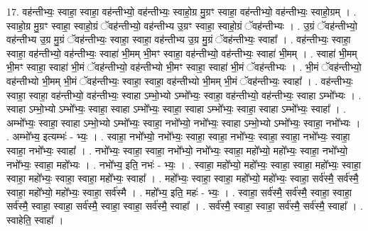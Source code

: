 \documentclass[17pt]{extarticle}
\begin{document}
17. वह॑न्तीभ्यः॒ स्वाहा॒ स्वाहा॒ वह॑न्तीभ्यो॒ वह॑न्तीभ्यः॒ स्वाहो॒ग्र मु॒ग्रꣳ स्वाहा॒ वह॑न्तीभ्यो॒ वह॑न्तीभ्यः॒ स्वाहो॒ग्रम् । . स्वाहो॒ग्र मु॒ग्रꣳ स्वाहा॒ स्वाहो॒ग्रं ॅवह॑न्तीभ्यो॒ वह॑न्तीभ्य उ॒ग्रꣳ स्वाहा॒ स्वाहो॒ग्रं ॅवह॑न्तीभ्यः । . उ॒ग्रं ॅवह॑न्तीभ्यो॒ वह॑न्तीभ्य उ॒ग्र मु॒ग्रं ॅवह॑न्तीभ्यः॒ स्वाहा॒ स्वाहा॒ वह॑न्तीभ्य उ॒ग्र मु॒ग्रं ॅवह॑न्तीभ्यः॒ स्वाहा᳚ । . वह॑न्तीभ्यः॒ स्वाहा॒ स्वाहा॒ वह॑न्तीभ्यो॒ वह॑न्तीभ्यः॒ स्वाहा॑ भी॒मम् भी॒मꣳ स्वाहा॒ वह॑न्तीभ्यो॒ वह॑न्तीभ्यः॒ स्वाहा॑ भी॒मम् । . स्वाहा॑ भी॒मम् भी॒मꣳ स्वाहा॒ स्वाहा॑ भी॒मं ॅवह॑न्तीभ्यो॒ वह॑न्तीभ्यो भी॒मꣳ स्वाहा॒ स्वाहा॑ भी॒मं ॅवह॑न्तीभ्यः । . भी॒मं ॅवह॑न्तीभ्यो॒ वह॑न्तीभ्यो भी॒मम् भी॒मं ॅवह॑न्तीभ्यः॒ स्वाहा॒ स्वाहा॒ वह॑न्तीभ्यो भी॒मम् भी॒मं ॅवह॑न्तीभ्यः॒ स्वाहा᳚ । . वह॑न्तीभ्यः॒ स्वाहा॒ स्वाहा॒ वह॑न्तीभ्यो॒ वह॑न्तीभ्यः॒ स्वाहा ऽम्भो॒भ्यो ऽम्भो᳚भ्यः॒ स्वाहा॒ वह॑न्तीभ्यो॒ वह॑न्तीभ्यः॒ स्वाहा ऽम्भो᳚भ्यः । . स्वाहा ऽम्भो॒भ्यो ऽम्भो᳚भ्यः॒ स्वाहा॒ स्वाहा ऽम्भो᳚भ्यः॒ स्वाहा॒ स्वाहा ऽम्भो᳚भ्यः॒ स्वाहा॒ स्वाहा ऽम्भो᳚भ्यः॒ स्वाहा᳚ । . अम्भो᳚भ्यः॒ स्वाहा॒ स्वाहा ऽम्भो॒भ्यो ऽम्भो᳚भ्यः॒ स्वाहा॒ नभो᳚भ्यो॒ नभो᳚भ्यः॒ स्वाहा ऽम्भो॒भ्यो ऽम्भो᳚भ्यः॒ स्वाहा॒ नभो᳚भ्यः । . अम्भो᳚भ्य॒ इत्यम्भः॑ - भ्यः॒ । . स्वाहा॒ नभो᳚भ्यो॒ नभो᳚भ्यः॒ स्वाहा॒ स्वाहा॒ नभो᳚भ्यः॒ स्वाहा॒ स्वाहा॒ नभो᳚भ्यः॒ स्वाहा॒ स्वाहा॒ नभो᳚भ्यः॒ स्वाहा᳚ । . नभो᳚भ्यः॒ स्वाहा॒ स्वाहा॒ नभो᳚भ्यो॒ नभो᳚भ्यः॒ स्वाहा॒ महो᳚भ्यो॒ महो᳚भ्यः॒ स्वाहा॒ नभो᳚भ्यो॒ नभो᳚भ्यः॒ स्वाहा॒ महो᳚भ्यः । . नभो᳚भ्य॒ इति॒ नभः॑ - भ्यः॒ । . स्वाहा॒ महो᳚भ्यो॒ महो᳚भ्यः॒ स्वाहा॒ स्वाहा॒ महो᳚भ्यः॒ स्वाहा॒ स्वाहा॒ महो᳚भ्यः॒ स्वाहा॒ स्वाहा॒ महो᳚भ्यः॒ स्वाहा᳚ । . महो᳚भ्यः॒ स्वाहा॒ स्वाहा॒ महो᳚भ्यो॒ महो᳚भ्यः॒ स्वाहा॒ सर्व॑स्मै॒ सर्व॑स्मै॒ स्वाहा॒ महो᳚भ्यो॒ महो᳚भ्यः॒ स्वाहा॒ सर्व॑स्मै । . महो᳚भ्य॒ इति॒ महः॑ - भ्यः॒ । . स्वाहा॒ सर्व॑स्मै॒ सर्व॑स्मै॒ स्वाहा॒ स्वाहा॒ सर्व॑स्मै॒ स्वाहा॒ स्वाहा॒ सर्व॑स्मै॒ स्वाहा॒ स्वाहा॒ सर्व॑स्मै॒ स्वाहा᳚ । . सर्व॑स्मै॒ स्वाहा॒ स्वाहा॒ सर्व॑स्मै॒ सर्व॑स्मै॒ स्वाहा᳚ । . स्वाहेति॒ स्वाहा᳚ । \newline
\pagebreak
{}
\end{document}
